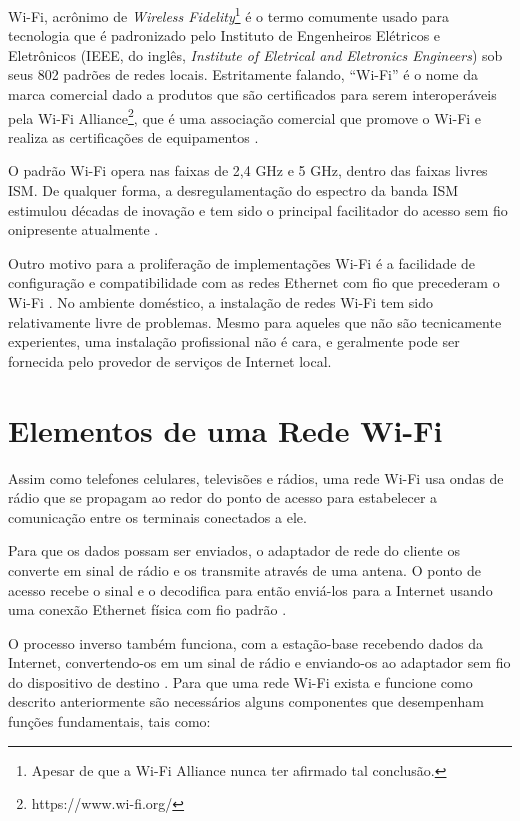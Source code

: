 Wi-Fi, acrônimo de \textit{Wireless Fidelity}\footnote{Apesar de que a Wi-Fi Alliance nunca ter afirmado tal conclusão.} é o termo comumente usado para tecnologia que é padronizado pelo Instituto de Engenheiros Elétricos e Eletrônicos (IEEE, do inglês, \textit{Institute of Eletrical and Eletronics Engineers}) sob seus 802 padrões de redes locais. Estritamente falando, ``Wi-Fi'' é o nome da marca comercial dado a produtos que são certificados para serem interoperáveis pela Wi-Fi Alliance\footnote{https://www.wi-fi.org/}, que é uma associação comercial que promove o Wi-Fi e realiza as certificações de equipamentos \cite{gorshe2014ieee}.

O padrão Wi-Fi opera nas faixas de 2,4 GHz e 5 GHz, dentro das faixas livres ISM. De qualquer forma, a desregulamentação do espectro da banda ISM estimulou décadas de inovação e tem sido o principal facilitador do acesso sem fio onipresente atualmente \cite{gorshe2014ieee}.

Outro motivo para a proliferação de implementações Wi-Fi é a facilidade de configuração e compatibilidade com as redes Ethernet com fio que precederam o Wi-Fi \cite{gorshe2014ieee}. No ambiente doméstico, a instalação de redes Wi-Fi tem sido relativamente livre de problemas. Mesmo para aqueles que não são tecnicamente experientes, uma instalação profissional não é cara, e geralmente pode ser fornecida pelo provedor de serviços de Internet local.

\section{Elementos de uma Rede Wi-Fi}
\label{elementos-rede-wifi}

Assim como telefones celulares, televisões e rádios, uma rede Wi-Fi usa ondas de rádio que se propagam ao redor do ponto de acesso para estabelecer a comunicação entre os terminais conectados a ele.

Para que os dados possam ser enviados, o adaptador de rede do cliente os converte em sinal de rádio e os transmite através de uma antena. O ponto de acesso recebe o sinal e o decodifica para então enviá-los para a Internet usando uma conexão Ethernet física com fio padrão \cite{brain2001}.

O processo inverso também funciona, com a estação-base recebendo dados da Internet, convertendo-os em um sinal de rádio e enviando-os ao adaptador sem fio do dispositivo de destino \cite{brain2001}.
Para que uma rede Wi-Fi exista e funcione como descrito anteriormente são necessários alguns componentes que desempenham funções fundamentais, tais como:

